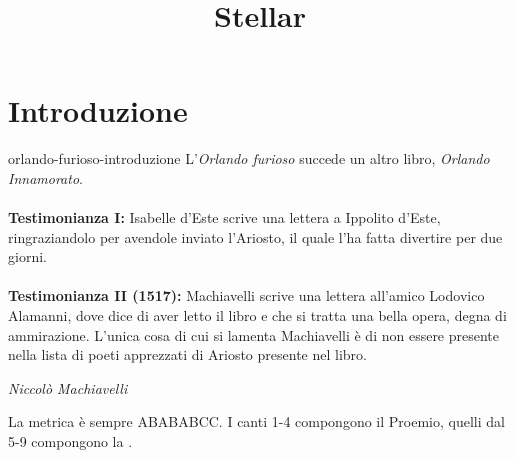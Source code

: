 \documentclass[preview]{standalone}
\begin{document}
\title{Stellar}
\genpage

\section{Introduzione}

\begin{snippet}{orlando-furioso-introduzione}
    L'\textit{Orlando furioso} succede un altro libro,
    \textit{Orlando Innamorato}.
    \\\\
    \textbf{Testimonianza I:} Isabelle d'Este scrive una lettera a Ippolito d'Este,
    ringraziandolo per avendole inviato l'Ariosto, il quale l'ha fatta
    divertire per due giorni.
    \\\\
    \textbf{Testimonianza II (1517):}  Machiavelli scrive una lettera all'amico
    Lodovico Alamanni, dove dice di aver letto il libro e
    che si tratta una bella opera, degna di ammirazione.
    L'unica cosa di cui si lamenta Machiavelli è di non essere presente nella lista di
    poeti apprezzati di Ariosto presente nel libro.
    
    \epigraph{}
    {\textit{Niccolò Machiavelli}}
    
    
    La metrica è sempre ABABABCC.
    I canti 1-4 compongono il Proemio, quelli dal 5-9 compongono la .
\end{snippet}
\end{document}
